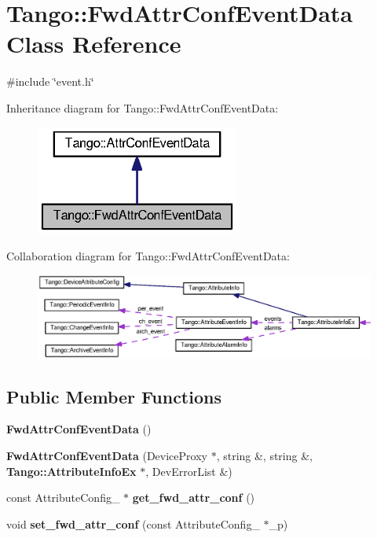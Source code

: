 \section{Tango\-:\-:Fwd\-Attr\-Conf\-Event\-Data Class Reference}
\label{classTango_1_1FwdAttrConfEventData}


{\ttfamily \#include \char`\"{}event.\-h\char`\"{}}



Inheritance diagram for Tango\-:\-:Fwd\-Attr\-Conf\-Event\-Data\-:
\nopagebreak
\begin{figure}[H]
\begin{center}
\leavevmode
\includegraphics[width=190pt]{d8/d1f/classTango_1_1FwdAttrConfEventData__inherit__graph}
\end{center}
\end{figure}


Collaboration diagram for Tango\-:\-:Fwd\-Attr\-Conf\-Event\-Data\-:
\nopagebreak
\begin{figure}[H]
\begin{center}
\leavevmode
\includegraphics[width=350pt]{d5/dff/classTango_1_1FwdAttrConfEventData__coll__graph}
\end{center}
\end{figure}
\subsection*{Public Member Functions}
\begin{DoxyCompactItemize}
\item 
{\bf Fwd\-Attr\-Conf\-Event\-Data} ()
\item 
{\bf Fwd\-Attr\-Conf\-Event\-Data} (Device\-Proxy $\ast$, string \&, string \&, {\bf Tango\-::\-Attribute\-Info\-Ex} $\ast$, Dev\-Error\-List \&)
\item 
const Attribute\-Config\-\_ $\ast$ {\bf get\-\_\-fwd\-\_\-attr\-\_\-conf} ()
\item 
void {\bf set\-\_\-fwd\-\_\-attr\-\_\-conf} (const Attribute\-Config\-\_ $\ast$\-\_\-p)
\end{DoxyCompactItemize}
